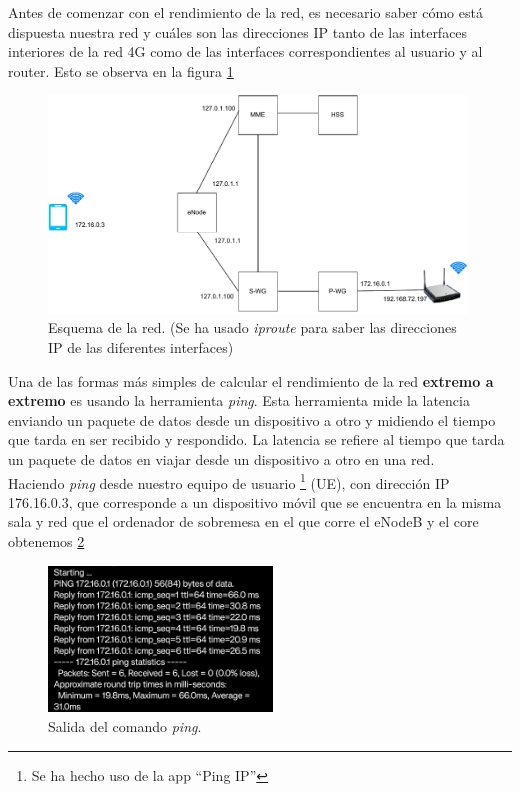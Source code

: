 Antes de comenzar con el rendimiento de la red, es necesario saber cómo está dispuesta nuestra red y cuáles son las direcciones IP tanto de las interfaces interiores de la red 4G como de las interfaces correspondientes al usuario y al router. Esto se observa en la figura \ref{fig:EsquemaRed}

\begin{figure}[H]
    \centering
    \includegraphics[width=0.99\textwidth]{Imagenes/Rendimiento/red.pdf}
    \caption{Esquema de la red. (Se ha usado \textit{iproute} para saber las direcciones IP de las diferentes interfaces)}
    \label{fig:EsquemaRed}
\end{figure}

Una de las formas más simples de calcular el rendimiento de la red \textbf{extremo a extremo} es usando la herramienta \textit{ping}. Esta herramienta mide la latencia enviando un paquete de datos desde un dispositivo a otro y midiendo el tiempo que tarda en ser recibido y respondido. La latencia se refiere al tiempo que tarda un paquete de datos en viajar desde un dispositivo a otro en una red.\\
Haciendo \textit{ping} desde nuestro equipo de usuario \footnote{Se ha hecho uso de la app “Ping IP”} (UE), con dirección IP 176.16.0.3, que corresponde a un dispositivo móvil  que se encuentra en la misma sala y red que el ordenador de sobremesa en el que corre el eNodeB y el core obtenemos \ref{fig:ping} 

 \begin{figure}[H]
    \centering
    \includegraphics[width=0.53\textwidth]{Imagenes/Rendimiento/ping.jpeg}
    \caption{Salida del comando \textit{ping}.}
    \label{fig:ping}
\end{figure}

